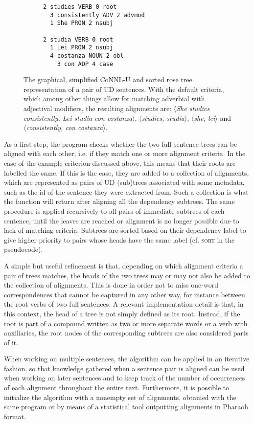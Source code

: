 \documentclass[11pt]{article}
\begin{document}
\begin{figure*}[h]
\begin{subfigure}{.32 \textwidth}
\begin{verbatim}
2 studies VERB 0 root  
  3 consistently ADV 2 advmod
  1 She PRON 2 nsubj
      
2 studia VERB 0 root
  1 Lei PRON 2 nsubj
  4 costanza NOUN 2 obl
    3 con ADP 4 case
    \end{verbatim}
  \end{subfigure}
  \caption{The graphical, simplified CoNNL-U and sorted rose tree representation of a pair of UD sentences. With the default criteria, which among other things allow for matching adverbial with adjectival modifiers, the resulting alignments are: $\langle$\textit{She studies consistently, Lei studia con costanza}$\rangle$, $\langle$\textit{studies, studia}$\rangle$, $\langle$\textit{she, lei}$\rangle$ and $\langle$\textit{consistently, con costanza}$\rangle$.}
  \label{ex}
\end{figure*}

As a first step, the program checks whether the two full sentence trees can be aligned with each other, i.e. if they match one or more alignment criteria. 
In the case of the example criterion discussed above, this means that their roots are labelled the same.
If this is the case, they are added to a collection of alignments, which are represented as pairs of UD (sub)trees associated with some metadata, such as the id of the sentence they were extracted from.
Such a collection is what the function will return after aligning all the dependency subtrees.
The same procedure is applied recursively to all pairs of immediate subtrees of each sentence, until the leaves are reached or alignment is no longer possible due to lack of matching criteria.
Subtrees are sorted based on their dependency label to give higher priority to pairs whose heads have the same label (cf. \textsc{sort} in the pseudocode).

A simple but useful refinement is that, depending on which alignment criteria a pair of trees matches, the heads of the two trees may or may not also be added to the collection of alignments. 
This is done in order not to miss one-word correspondences that cannot be captured in any other way, for instance between the root verbs of two full sentences.
A relevant implementation detail is that, in this context, the head of a tree is not simply defined as its root. Instead, if the root is part of a compound written as two or more separate words or a verb with auxiliaries, the root nodes of the corresponding subtrees are also considered parts of it.

When working on multiple sentences, the algorithm can be applied in an iterative fashion, so that knowledge gathered when a sentence pair is aligned can be used when working on later sentences and to keep track of the number of occurrences of each alignment throughout the entire text.
Furthermore, it is possible to initialize the algorithm with a nonempty set of alignments, obtained with the same program or by means of a statistical tool outputting alignments in Pharaoh format.
\end{document}
